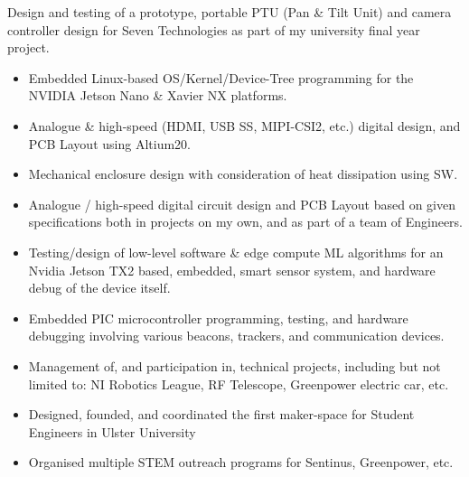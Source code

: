 \documentclass[10pt,a4paper,ragged2e,withhyper]{altacv}
\begin{document}

\begin{paracol}{2}




Design and testing of a prototype, portable PTU (Pan \& Tilt Unit) and camera controller design for Seven Technologies as part of my university final year project.
\begin{itemize}
\item Embedded Linux-based OS/Kernel/Device-Tree programming for the NVIDIA Jetson Nano \& Xavier NX platforms.
\item Analogue \& high-speed (HDMI, USB SS, MIPI-CSI2, etc.) digital design, and PCB Layout using Altium20.
\item Mechanical enclosure design with consideration of heat dissipation using SW.
\end{itemize}


\divider


\begin{itemize}
\item Analogue / high-speed digital circuit design and PCB Layout based on given specifications both in projects on my own, and as part of a team of Engineers.
\item Testing/design of low-level software \& edge compute ML algorithms for an Nvidia Jetson TX2 based, embedded, smart sensor system, and hardware debug of the device itself.
\item Embedded PIC microcontroller programming, testing, and hardware debugging involving various beacons, trackers, and communication devices.
\end{itemize}


\divider


\begin{itemize}
\item Management of, and participation in, technical projects, including but not limited to: NI Robotics League, RF Telescope, Greenpower electric car, etc.
\item Designed, founded, and coordinated the first maker-space for Student Engineers in Ulster University
\item Organised multiple STEM outreach programs for Sentinus, Greenpower, etc.
\end{itemize}



\end{paracol}
\end{document}

